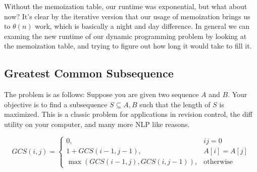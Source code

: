 Without the memoization table, our runtime was exponential, but what about now?
It's clear by the iterative version that our usage of memoization brings us to
$\theta(n)$ work, which is basically a night and day difference. In general we
can examing the new runtime of our dynamic programming problem by looking at the
memoization table, and trying to figure out how long it would take to fill it.

\subsection{Greatest Common Subsequence}

The problem is as follows: Suppose you are given two sequence $A$ and $B$. Your
objective is to find a subsequence $S \subseteq A, B$ such that the length of
$S$ is maximized. This is a classic problem for applications in revision
control, the diff utility on your computer, and many more NLP like reasons.

$$
GCS(i,j) = \begin{cases}
0, & ij = 0 \\
1 + GCS(i-1,j-1), & A[i] = A[j] \\
\max(GCS(i-1,j),GCS(i,j-1)), & \text{otherwise}
\end{cases}
$$

